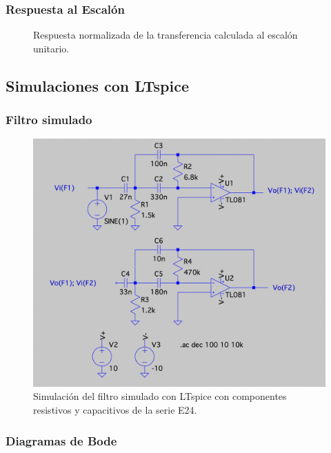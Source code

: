 \documentclass[10pt,a4paper]{article}
\begin{document}
    \subsubsection{Respuesta al Escalón}

    \begin{figure}[H]
        \centering
        \scalebox{0.85}{}
        \caption{Respuesta normalizada de la transferencia calculada al escalón unitario.}
        \label{fig}
    \end{figure}


    \subsection{Simulaciones con LTspice}
    \subsubsection{Filtro simulado}
    \begin{figure}[H]
        \centerline{\includegraphics[width=1.1\textwidth,center]{images/ltspice/spice_complete_filter.png}}
        \caption{Simulación del filtro simulado con LTspice con componentes resistivos y capacitivos de la serie E24.}
        \label{fig}
    \end{figure}
    \subsubsection{Diagramas de Bode}
\end{document}
